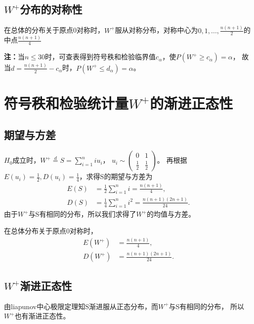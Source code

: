 \documentclass[lang=cn,10pt]{elegantbook}
\begin{document}
\subsection{$W^+$分布的对称性}
\begin{proposition}
    在总体的分布关于原点0对称时，$W^+$服从对称分布，对称中心为$0,1,...,\frac{n(n+1)}2$的中点$\frac{n(n+1)}4$
\end{proposition}
\textbf{注：}当$n\leq 30$时，可查表得到符号秩和检验临界值$c_\alpha$，使$P(W^+\geq c_\alpha)=\alpha$，
故当$d=\frac{n(n+1)}2-c_\alpha$时，$P(W^+\leq d_\alpha)=\alpha$。

\section{符号秩和检验统计量$W^+$的渐进正态性}
\subsection{期望与方差}
$H_0$成立时，$W^+\overset{d}{\operatorname*{=}}S=\sum_{i=1}^{n}iu_i$，
$u_i\sim\begin{pmatrix}
        0       & 1       \\
        \frac12 & \frac12
    \end{pmatrix}$。
再根据$E(u_i)=\frac12,D(u_i)=\frac14$，求得S的期望与方差为
\begin{equation}
    \begin{aligned}
        E(S) & =\frac12\sum_{i=1}^ni=\frac{n\left(n+1\right)}4,                       \\
        D(S) & =\frac14\sum_{i=1}^ni^2=\frac{n\left(n+1\right)\left(2n+1\right)}{24}.
    \end{aligned}
\end{equation}
由于$W^+$与S有相同的分布，所以我们求得了$W^+$的均值与方差。
\begin{proposition}
    在总体分布关于原点0对称时，
    \begin{equation}
        \begin{aligned}
            E(W^+) & =\frac{n\left(n+1\right)}4,                     \\
            D(W^+) & =\frac{n\left(n+1\right)\left(2n+1\right)}{24}.
        \end{aligned}
    \end{equation}
\end{proposition}

\subsection{$W^+$渐进正态性}
由liapunov中心极限定理知S渐进服从正态分布，而$W^+$与S有相同的分布，
所以$W^+$也有渐进正态性。
\end{document}
